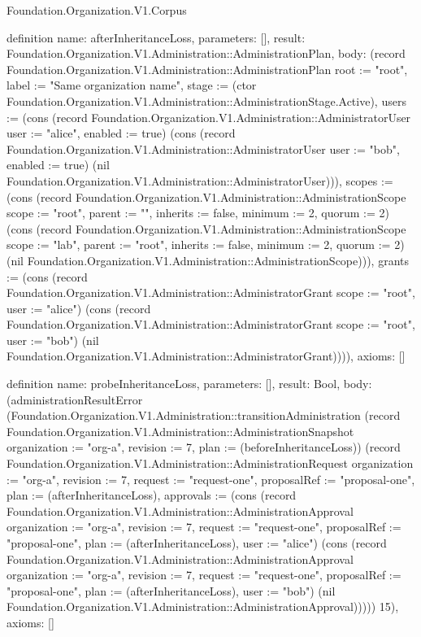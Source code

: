 \begin{lexlean}{Foundation.Organization.V1.Corpus}
\begin{semanticmodule}
definition{
  name: afterInheritanceLoss,
  parameters: [],
  result: Foundation.Organization.V1.Administration::AdministrationPlan,
  body: (record Foundation.Organization.V1.Administration::AdministrationPlan {root := "root", label := "Same organization name", stage := (ctor Foundation.Organization.V1.Administration::AdministrationStage.Active), users := (cons (record Foundation.Organization.V1.Administration::AdministratorUser {user := "alice", enabled := true}) (cons (record Foundation.Organization.V1.Administration::AdministratorUser {user := "bob", enabled := true}) (nil Foundation.Organization.V1.Administration::AdministratorUser))), scopes := (cons (record Foundation.Organization.V1.Administration::AdministrationScope {scope := "root", parent := "", inherits := false, minimum := 2, quorum := 2}) (cons (record Foundation.Organization.V1.Administration::AdministrationScope {scope := "lab", parent := "root", inherits := false, minimum := 2, quorum := 2}) (nil Foundation.Organization.V1.Administration::AdministrationScope))), grants := (cons (record Foundation.Organization.V1.Administration::AdministratorGrant {scope := "root", user := "alice"}) (cons (record Foundation.Organization.V1.Administration::AdministratorGrant {scope := "root", user := "bob"}) (nil Foundation.Organization.V1.Administration::AdministratorGrant)))}),
  axioms: []
}

definition{
  name: probeInheritanceLoss,
  parameters: [],
  result: Bool,
  body: (administrationResultError (Foundation.Organization.V1.Administration::transitionAdministration (record Foundation.Organization.V1.Administration::AdministrationSnapshot {organization := "org-a", revision := 7, plan := (beforeInheritanceLoss)}) (record Foundation.Organization.V1.Administration::AdministrationRequest {organization := "org-a", revision := 7, request := "request-one", proposalRef := "proposal-one", plan := (afterInheritanceLoss), approvals := (cons (record Foundation.Organization.V1.Administration::AdministrationApproval {organization := "org-a", revision := 7, request := "request-one", proposalRef := "proposal-one", plan := (afterInheritanceLoss), user := "alice"}) (cons (record Foundation.Organization.V1.Administration::AdministrationApproval {organization := "org-a", revision := 7, request := "request-one", proposalRef := "proposal-one", plan := (afterInheritanceLoss), user := "bob"}) (nil Foundation.Organization.V1.Administration::AdministrationApproval)))})) 15),
  axioms: []
}


\end{semanticmodule}
\end{lexlean}
